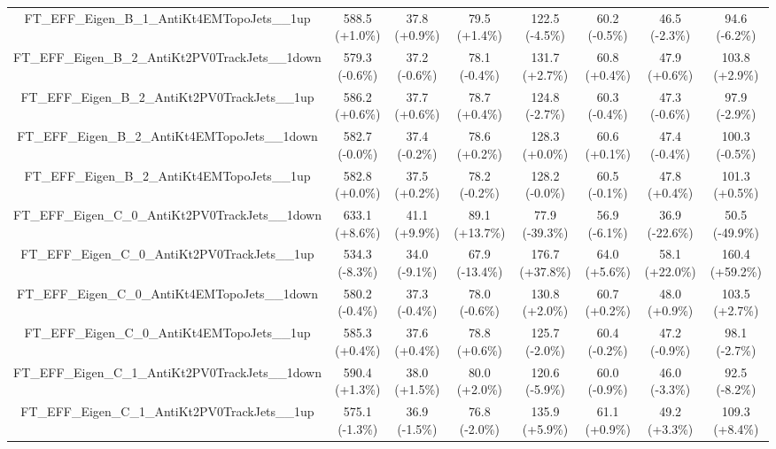 \begin{table}[htbp!]
\begin{tiny}
\begin{center}
\begin{tabular}{c|c|c|c||c|c|c|c}
FT\_EFF\_Eigen\_B\_1\_AntiKt4EMTopoJets\_\_1up               & 588.5     (+1.0\%) & 37.8      (+0.9\%) & 79.5      (+1.4\%) & 122.5     (-4.5\%) & 60.2      (-0.5\%) & 46.5      (-2.3\%) & 94.6      (-6.2\%) \\ 
FT\_EFF\_Eigen\_B\_2\_AntiKt2PV0TrackJets\_\_1down           & 579.3     (-0.6\%) & 37.2      (-0.6\%) & 78.1      (-0.4\%) & 131.7     (+2.7\%) & 60.8      (+0.4\%) & 47.9      (+0.6\%) & 103.8     (+2.9\%) \\ 
FT\_EFF\_Eigen\_B\_2\_AntiKt2PV0TrackJets\_\_1up             & 586.2     (+0.6\%) & 37.7      (+0.6\%) & 78.7      (+0.4\%) & 124.8     (-2.7\%) & 60.3      (-0.4\%) & 47.3      (-0.6\%) & 97.9      (-2.9\%) \\ 
FT\_EFF\_Eigen\_B\_2\_AntiKt4EMTopoJets\_\_1down             & 582.7     (-0.0\%) & 37.4      (-0.2\%) & 78.6      (+0.2\%) & 128.3     (+0.0\%) & 60.6      (+0.1\%) & 47.4      (-0.4\%) & 100.3     (-0.5\%) \\ 
FT\_EFF\_Eigen\_B\_2\_AntiKt4EMTopoJets\_\_1up               & 582.8     (+0.0\%) & 37.5      (+0.2\%) & 78.2      (-0.2\%) & 128.2     (-0.0\%) & 60.5      (-0.1\%) & 47.8      (+0.4\%) & 101.3     (+0.5\%) \\ 
FT\_EFF\_Eigen\_C\_0\_AntiKt2PV0TrackJets\_\_1down           & 633.1     (+8.6\%) & 41.1      (+9.9\%) & 89.1      (+13.7\%) & 77.9      (-39.3\%) & 56.9      (-6.1\%) & 36.9      (-22.6\%) & 50.5      (-49.9\%) \\ 
FT\_EFF\_Eigen\_C\_0\_AntiKt2PV0TrackJets\_\_1up             & 534.3     (-8.3\%) & 34.0      (-9.1\%) & 67.9      (-13.4\%) & 176.7     (+37.8\%) & 64.0      (+5.6\%) & 58.1      (+22.0\%) & 160.4     (+59.2\%) \\ 
FT\_EFF\_Eigen\_C\_0\_AntiKt4EMTopoJets\_\_1down             & 580.2     (-0.4\%) & 37.3      (-0.4\%) & 78.0      (-0.6\%) & 130.8     (+2.0\%) & 60.7      (+0.2\%) & 48.0      (+0.9\%) & 103.5     (+2.7\%) \\ 
FT\_EFF\_Eigen\_C\_0\_AntiKt4EMTopoJets\_\_1up               & 585.3     (+0.4\%) & 37.6      (+0.4\%) & 78.8      (+0.6\%) & 125.7     (-2.0\%) & 60.4      (-0.2\%) & 47.2      (-0.9\%) & 98.1      (-2.7\%) \\ 
FT\_EFF\_Eigen\_C\_1\_AntiKt2PV0TrackJets\_\_1down           & 590.4     (+1.3\%) & 38.0      (+1.5\%) & 80.0      (+2.0\%) & 120.6     (-5.9\%) & 60.0      (-0.9\%) & 46.0      (-3.3\%) & 92.5      (-8.2\%) \\ 
FT\_EFF\_Eigen\_C\_1\_AntiKt2PV0TrackJets\_\_1up             & 575.1     (-1.3\%) & 36.9      (-1.5\%) & 76.8      (-2.0\%) & 135.9     (+5.9\%) & 61.1      (+0.9\%) & 49.2      (+3.3\%) & 109.3     (+8.4\%) \\ 

\end{tabular}
\end{center}
\end{tiny}
\end{table}
